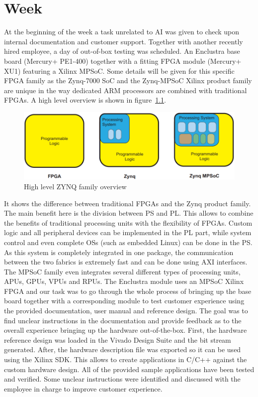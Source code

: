 \chapter{Week}
At the beginning of the week a task unrelated to \ac{AI} was given to check upon internal documentation and customer support. Together with another recently hired employee, a day of out-of-box testing was scheduled. An Enclustra base board (Mercury+ PE1-400) together with a fitting \ac{FPGA} module (Mercury+ XU1) featuring a Xilinx \ac{MPSoC}.
Some details will be given for this specific \ac{FPGA} family as the Zynq-7000 \ac{SoC} and the Zynq-\ac{MPSoC} Xilinx product family are unique in the way dedicated ARM processors are combined with traditional \acp{FPGA}. A high level overview is shown in figure~\ref{fig:zynq-overview}.
\begin{figure}[!htb]
	\centering
		\includegraphics[width=\textwidth]{bilder/ZYNQ-overview.png}
		\caption{High level ZYNQ family overview~\cite{zynq-book}}
		\label{fig:zynq-overview}
\end{figure}
It shows the difference between traditional \acp{FPGA} and the Zynq product family. The main benefit here is the division between \ac{PS} and \ac{PL}. This allows to combine the benefits of traditional processing units with the flexibility of \acp{FPGA}. Custom logic and all peripheral devices can be implemented in the \ac{PL} part, while system control and even complete \acp{OS} (such as embedded Linux) can be done in the \ac{PS}. As this system is completely integrated in one package, the communication between the two fabrics is extremely fast and can be done using \ac{AXI} interfaces. The \ac{MPSoC} family even integrates several different types of processing units, \acp{APU}, \acp{GPU}, \acp{VPU} and \acp{RPU}.
The Enclustra module uses an \ac{MPSoC} Xilinx FPGA and our task was to go through the whole process of bringing up the base board together with a corresponding module to test customer experience using the provided documentation, user manual and reference design. The goal was to find unclear instructions in the documentation and provide feedback as to the overall experience bringing up the hardware out-of-the-box. First, the hardware reference design was loaded in the Vivado Design Suite and the bit stream generated. After, the hardware description file was exported so it can be used using the Xilinx \ac{SDK}. This allows to create applications in C/C++ against the custom hardware design. All of the provided sample applications have been tested and verified. Some unclear instructions were identified and discussed with the employee in charge to improve customer experience.
